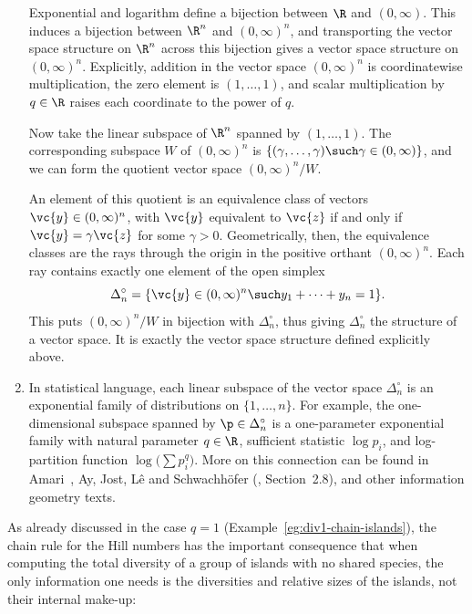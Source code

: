 \begin{remarks}
\begin{enumerate}
Exponential and logarithm define a bijection between $\R$ and $(0,
\infty)$.  This induces a bijection between $\R^n$ and $(0, \infty)^n$, and
transporting the vector space structure on $\R^n$ across this bijection
gives a vector space structure on $(0, \infty)^n$.  Explicitly, addition in
the vector space $(0, \infty)^n$ is coordinatewise multiplication, the zero
element is $(1, \ldots, 1)$, and scalar multiplication by $q \in \R$ raises
each coordinate to the power of $q$.

Now take the linear subspace of $\R^n$ spanned by $(1, \ldots, 1)$.  The
corresponding subspace $W$ of $(0, \infty)^n$ is $\{ (\gamma, \ldots,
\gamma) \such \gamma \in (0, \infty) \}$, and we can form the quotient
vector space $(0, \infty)^n/W$.

An element of this quotient is an equivalence class of vectors $\vc{y} \in
(0, \infty)^n$, with $\vc{y}$ equivalent to $\vc{z}$ if and only if $\vc{y}
= \gamma\vc{z}$ for some $\gamma > 0$.  Geometrically, then, the
equivalence classes are the rays through the origin in the positive orthant
$(0, \infty)^n$.  Each ray contains exactly one element of the open simplex
\[
\Delta_n^\circ
=
\{ \vc{y} \in (0, \infty)^n \such y_1 + \cdots + y_n = 1 \}.
\]
This puts $(0, \infty)^n/W$ in bijection with $\Delta_n^\circ$, thus giving
$\Delta_n^\circ$ the structure of a vector space.  It is exactly the
vector space structure defined explicitly above.

\item
In statistical language, each linear subspace of the vector space
$\Delta_n^\circ$ is an exponential%
%
% 
family of distributions on $\{1, \ldots, n\}$.  For example, the
one-dimensional subspace spanned by $\p \in \Delta_n^\circ$ is a
one-parameter exponential family with natural parameter $q \in \R$,
sufficient statistic $\log p_i$, and log-partition%
%
%
function $\log\bigl(\sum p_i^q\bigr)$.  More on this connection
can be found in Amari~\cite{AmarDGC}, Ay, Jost, L\^{e} and
Schwachh\"ofer (\cite{AJLS}, Section~2.8), and other information%
%
%
geometry texts.
\end{enumerate}
\end{remarks}

As already discussed in the case $q = 1$
(Example~\ref{eg:div1-chain-islands}), the chain rule for the Hill numbers
has the important consequence that when computing the total diversity of a
group of islands%
%
% 
with no shared species, the only information one needs is the diversities
and relative sizes of the islands, not their internal make-up:

